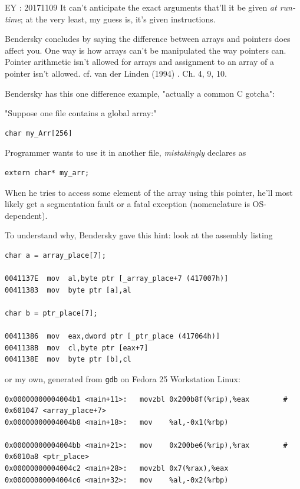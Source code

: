 \documentclass[10pt]{amsart}
\begin{document}
EY : 20171109 It can't anticipate the exact arguments that'll it be given \emph{at run-time}; at the very least, my guess is, it's given instructions.  

Bendersky \cite{Bend} concludes by saying the difference between arrays and pointers does affect you.  One way is how arrays can't be manipulated the way pointers can.  Pointer arithmetic isn't allowed for arrays and assignment to an array of a pointer isn't allowed.  cf. van der Linden (1994) \cite{Vand1994}. Ch. 4, 9, 10.  

Bendersky \cite{Bend} has this one difference example, "actually a common C gotcha":  

"Suppose one file contains a global array:"  

\begin{lstlisting}
char my_Arr[256]  
\end{lstlisting}

Programmer wants to use it in another file, \emph{mistakingly} declares as  
\begin{lstlisting}
extern char* my_arr; 
\end{lstlisting}

When he tries to access some element of the array using this pointer, he'll most likely get a segmentation fault or a fatal exception (nomenclature is OS-dependent).  

To understand why, Bendersky \cite{Bend} gave this hint:  look at the assembly listing  

\begin{lstlisting}
char a = array_place[7];

0041137E  mov  al,byte ptr [_array_place+7 (417007h)]
00411383  mov  byte ptr [a],al

char b = ptr_place[7];

00411386  mov  eax,dword ptr [_ptr_place (417064h)]
0041138B  mov  cl,byte ptr [eax+7]
0041138E  mov  byte ptr [b],cl
\end{lstlisting}

or my own, generated from \verb|gdb| on Fedora 25 Workstation Linux:

\begin{lstlisting}
0x00000000004004b1 <main+11>:	movzbl 0x200b8f(%rip),%eax        # 0x601047 <array_place+7>
0x00000000004004b8 <main+18>:	mov    %al,-0x1(%rbp)

0x00000000004004bb <main+21>:	mov    0x200be6(%rip),%rax        # 0x6010a8 <ptr_place>
0x00000000004004c2 <main+28>:	movzbl 0x7(%rax),%eax
0x00000000004004c6 <main+32>:	mov    %al,-0x2(%rbp)
\end{lstlisting}
\end{document}
